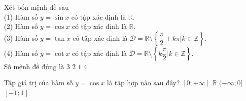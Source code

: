 

\begin{ex}%
	Xét bốn mệnh đề sau\\ 
	(1) Hàm số $y=\sin x$ có tập  xác định là $\mathbb{R}$.\\
	(2) Hàm số $y=\cos x$ có tập xác định là  $\mathbb{R}$.\\
	(3) Hàm số $y=\tan  x$ có tập xác định là $\mathscr{D}=\mathbb{R}\setminus \left\{\dfrac{\pi}{2}+k\pi \left| k\in \mathbb{Z}\right.\right\}$.\\
	(4) Hàm số $y=\cot x$ có tập xác định là $\mathscr{D}=\mathbb{R}\setminus \left\{k\dfrac{\pi}{2}\left|  k\in \mathbb{Z}\right.\right\}$.\\
	 Số mệnh đề đúng là
	 \choice
		{\True $3$} 
		 {$2$}
		 {$1$}
		 {$4$}
\end{ex}

\begin{ex}%
	Tập giá trị của hàm  số $y= \cos x$ là tập hợp nào sau đây?
	\choice 
		{$[0;  +\infty]$}
		{$\mathbb{R}$} 
		 {$(-\infty; 0]$}
		{\True  $ [-1; 1]$}
\end{ex}



